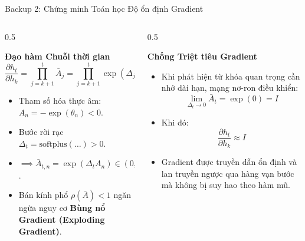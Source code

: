 \documentclass[aspectratio=169, 10pt]{beamer}
\begin{document}
\begin{frame}{Backup 2: Chứng minh Toán học Độ ổn định Gradient}
  \begin{columns}
    \begin{column}{0.5\textwidth}
      \begin{block}{\textbf{Đạo hàm Chuỗi thời gian}}
        $$\frac{\partial h_t}{\partial h_k} = \prod_{j=k+1}^t \bar{A}_j = \prod_{j=k+1}^t \exp(\Delta_j A)$$
        \begin{itemize}
          \item Tham số hóa thực âm: $A_n = -\exp(\theta_n) < 0$.
          \item Bước rời rạc $\Delta_t = \text{softplus}(\dots) > 0$.
          \item $\implies \bar{A}_{t,n} = \exp(\Delta_t A_n) \in (0, 1)$.
          \item Bán kính phổ $\rho(\bar{A}) < 1$ ngăn ngừa nguy cơ \textbf{Bùng nổ Gradient (Exploding Gradient)}.
        \end{itemize}
      \end{block}
    \end{column}
    \begin{column}{0.5\textwidth}
      \begin{block}{\textbf{Chống Triệt tiêu Gradient}}
        \begin{itemize}
          \item Khi phát hiện từ khóa quan trọng cần nhớ dài hạn, mạng nơ-ron điều khiển:
            $$\lim_{\Delta_t \to 0} \bar{A}_t = \exp(0) = I$$
          \item Khi đó:
            $$\frac{\partial h_t}{\partial h_k} \approx I$$
          \item Gradient được truyền dẫn ổn định và lan truyền ngược qua hàng vạn bước mà không bị suy hao theo hàm mũ.
        \end{itemize}
      \end{block}
    \end{column}
  \end{columns}
\end{frame}
\end{document}

